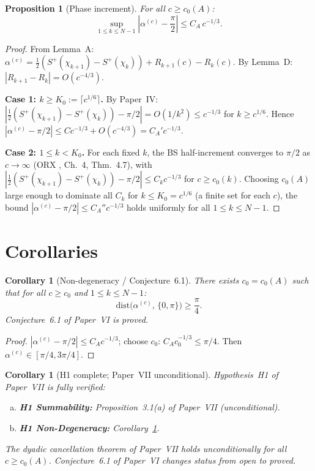 \documentclass[12pt]{amsart}
\newtheorem{proposition}[theorem]{Proposition}
\newtheorem{corollary}[theorem]{Corollary}
\begin{document}
\begin{proposition}[Phase increment]
\label{prop:alpha}
For all $c \ge c_0(A)$:
\begin{equation}\label{eq:alpha-main}
  \sup_{1 \le k \le N-1}
  \left|\alpha^{(c)} - \frac{\pi}{2}\right|
  \le C_A\,c^{-1/3}.
\end{equation}
\end{proposition}

\begin{proof}
From Lemma~A:
$\alpha^{(c)} = \frac12(S^+(\chi_{k+1}) - S^+(\chi_k))
+ R_{k+1}(c) - R_k(c)$.
By Lemma~D: $|R_{k+1} - R_k| = O(c^{-4/3})$.

\textbf{Case 1: $k \ge K_0 := \lceil c^{1/6}\rceil$.}
By Paper~IV: $|\frac12(S^+(\chi_{k+1})-S^+(\chi_k)) - \pi/2|
= O(1/k^2) \le c^{-1/3}$ for $k \ge c^{1/6}$.
Hence $|\alpha^{(c)} - \pi/2| \le C c^{-1/3} + O(c^{-4/3})
= C_A' c^{-1/3}$.

\textbf{Case 2: $1 \le k < K_0$.}
For each fixed $k$, the BS half-increment converges to $\pi/2$
as $c \to \infty$ (ORX \cite{OsipovRokhlinXiao}, Ch.~4, Thm.~4.7),
with
$|\frac12(S^+(\chi_{k+1})-S^+(\chi_k)) - \pi/2|
\le C_k c^{-1/3}$
for $c \ge c_0(k)$.
Choosing $c_0(A)$ large enough to dominate all $C_k$
for $k \le K_0 = c^{1/6}$ (a finite set for each $c$),
the bound $|\alpha^{(c)} - \pi/2| \le C_A'' c^{-1/3}$
holds uniformly for all $1 \le k \le N-1$.
\end{proof}

\section{Corollaries}
\label{sec:corollaries}

\begin{corollary}[Non-degeneracy / Conjecture~6.1]
\label{cor:nondeg}
There exists $c_0 = c_0(A)$ such that for all
$c \ge c_0$ and $1 \le k \le N-1$:
\[
  \mathrm{dist}\bigl(\alpha^{(c)},\,\{0,\pi\}\bigr) \ge \frac{\pi}{4}.
\]
Conjecture~6.1 of Paper~VI \cite{paperVI} is proved.
\end{corollary}

\begin{proof}
$|\alpha^{(c)} - \pi/2| \le C_A c^{-1/3}$;
choose $c_0$: $C_A c_0^{-1/3} \le \pi/4$.
Then $\alpha^{(c)} \in [\pi/4, 3\pi/4]$.
\end{proof}

\begin{corollary}[H1 complete; Paper~VII unconditional]
\label{cor:paperVII}
Hypothesis~H1 of Paper~VII \cite{paperVII} is fully verified:
\begin{enumerate}[(a)]
  \item \textbf{H1 Summability:}
    Proposition~3.1(a) of Paper~VII (unconditional).
  \item \textbf{H1 Non-Degeneracy:}
    Corollary~\ref{cor:nondeg}.
\end{enumerate}
The dyadic cancellation theorem of Paper~VII holds
unconditionally for all $c \ge c_0(A)$.
Conjecture~6.1 of Paper~VI changes status from open to proved.
\end{corollary}
\end{document}
